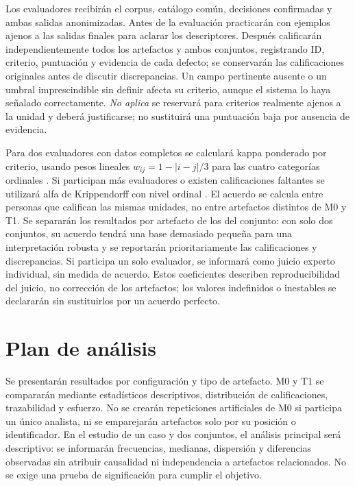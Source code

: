 Los evaluadores recibirán el corpus, catálogo común, decisiones confirmadas y ambas salidas anonimizadas. Antes de la evaluación practicarán con ejemplos ajenos a las salidas finales para aclarar los descriptores. Después calificarán independientemente todos los artefactos y ambos conjuntos, registrando ID, criterio, puntuación y evidencia de cada defecto; se conservarán las calificaciones originales antes de discutir discrepancias. Un campo pertinente ausente o un umbral imprescindible sin definir afecta su criterio, aunque el sistema lo haya señalado correctamente. \emph{No aplica} se reservará para criterios realmente ajenos a la unidad y deberá justificarse; no sustituirá una puntuación baja por ausencia de evidencia.

Para dos evaluadores con datos completos se calculará kappa ponderado por criterio, usando pesos lineales \(w_{ij}=1-|i-j|/3\) para las cuatro categorías ordinales \cite{cohen1968}. Si participan más evaluadores o existen calificaciones faltantes se utilizará alfa de Krippendorff con nivel ordinal \cite{hayes2007}. El acuerdo se calcula entre personas que califican las mismas unidades, no entre artefactos distintos de M0 y T1. Se separarán los resultados por artefacto de los del conjunto: con solo dos conjuntos, su acuerdo tendrá una base demasiado pequeña para una interpretación robusta y se reportarán prioritariamente las calificaciones y discrepancias. Si participa un solo evaluador, se informará como juicio experto individual, sin medida de acuerdo. Estos coeficientes describen reproducibilidad del juicio, no corrección de los artefactos; los valores indefinidos o inestables se declararán sin sustituirlos por un acuerdo perfecto.

\section{Plan de análisis}

Se presentarán resultados por configuración y tipo de artefacto. M0 y T1 se compararán mediante estadísticos descriptivos, distribución de calificaciones, trazabilidad y esfuerzo. No se crearán repeticiones artificiales de M0 si participa un único analista, ni se emparejarán artefactos solo por su posición o identificador. En el estudio de un caso y dos conjuntos, el análisis principal será descriptivo: se informarán frecuencias, medianas, dispersión y diferencias observadas sin atribuir causalidad ni independencia a artefactos relacionados. No se exige una prueba de significación para cumplir el objetivo.

